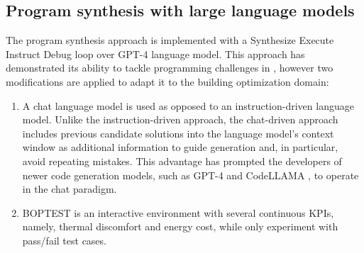 \newpage
\subsection{Program synthesis with large language models}
\label{sec:boptest-ProgramSynthesis}
The program synthesis approach is implemented with a Synthesize Execute Instruct Debug loop over GPT-4 \cite{GPT2023} language model. This approach has demonstrated its ability to tackle programming challenges in \cite{Reflexion2023,teaching2023,Fully2023}, however two modifications are applied to adapt it to the building optimization domain:

\begin{enumerate}
  \item A chat language model is used as opposed to an instruction-driven language model. Unlike the instruction-driven approach, the chat-driven approach includes previous candidate solutions into the language model’s context window as additional information to guide generation and, in particular, avoid repeating mistakes. This advantage has prompted the developers of newer code generation models, such as GPT-4 and CodeLLAMA \cite{Code2023}, to operate in the chat paradigm.
  \item BOPTEST is an interactive environment with several continuous KPIs, namely, thermal discomfort and energy cost, while \cite{Reflexion2023,teaching2023,Fully2023} only experiment with pass/fail test cases.
\end{enumerate}

